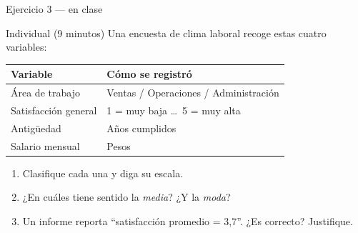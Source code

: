 \documentclass[aspectratio=169,10pt]{beamer}
\begin{document}
\begin{frame}{Ejercicio 3 — en clase}
  \begin{alertblock}{Individual (9 minutos)}
    Una encuesta de clima laboral recoge estas cuatro variables:

    \vspace{0.2cm}
    \centering\footnotesize
    \begin{tabular}{@{}ll@{}}
      \toprule
      \textbf{Variable} & \textbf{Cómo se registró} \\
      \midrule
      Área de trabajo        & Ventas / Operaciones / Administración \\
      Satisfacción general   & 1 = muy baja \dots\ 5 = muy alta \\
      Antigüedad             & Años cumplidos \\
      Salario mensual        & Pesos \\
      \bottomrule
    \end{tabular}

    \vspace{0.2cm}
    \raggedright
    \begin{enumerate}
      \item Clasifique cada una y diga su escala.
      \item ¿En cuáles tiene sentido la \emph{media}? ¿Y la \emph{moda}?
      \item Un informe reporta ``satisfacción promedio = 3{,}7''.
            ¿Es correcto? Justifique.
    \end{enumerate}
  \end{alertblock}
\end{frame}
\end{document}

